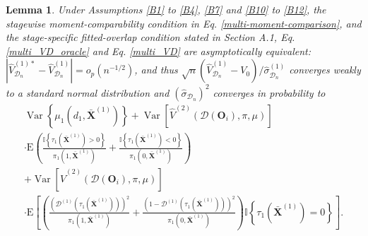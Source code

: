 \documentclass[11pt]{article}
\theoremstyle{referenceplain}
\newtheorem{lemma}{Lemma}[section]
\theoremstyle{referencedefinition}
\theoremstyle{referenceremark}
\begin{document}
\begin{lemma}\label{multi-lem}
      Under Assumptions \ref{B1} to \ref{B4}, \ref{B7} and \ref{B10} to \ref{B12}, the stagewise moment-comparability condition in Eq. \eqref{multi-moment-comparison}, {and the stage-specific fitted-overlap condition stated in Section A.1,} Eq. \eqref{multi_VD_oracle} and Eq. \eqref{multi_VD} are asymptotically equivalent: $|\widehat{V}_{\mathcal{D}_n}^{(1)*} - \widehat{V}_{\mathcal{D}_n}^{(1)}|=o_p(n^{-1/2})$, and thus $\sqrt{n}(\widehat{V}_{\mathcal{D}_n}^{(1)}-V_0)/\widehat{\sigma}_{\mathcal{D}_n}^{(1)}$ converges weakly to a standard normal distribution and $(\widehat{\sigma}_{\mathcal{D}_n})^2$ converges in probability to
    \begin{align*}
          \operatorname{Var}\left\{\mu_1\left(d_1, \bar{\mathbf{X}}^{(1)}\right)\right\}+\operatorname{Var}\left[\widehat{V}^{(2)}(\mathcal{D}(\mathbf{O}_i),\pi,\mu)\right]\\\cdot \mathrm{E}\left(\frac{\mathbb{I}\left\{\tau_1\left(\bar{\mathbf{X}}^{(1)}\right)>0\right\}}{\pi_1\left(1, \bar{\mathbf{X}}^{(1)}\right)}+\frac{\mathbb{I}\left\{\tau_1\left(\bar{\mathbf{X}}^{(1)}\right)<0\right\}}{\pi_1\left(0, \bar{\mathbf{X}}^{(1)}\right)}\right)\\
    +\operatorname{Var}\left[\widehat{V}^{(2)}(\mathcal{D}(\mathbf{O}_i),\pi,\mu)\right]\\\cdot\mathrm{E}\left[\left(\frac{(\mathcal{D}^{(1)}(\tau_1(\bar{\mathbf{X}}^{(1)})))^2}{\pi_1\left(1, \bar{\mathbf{X}}^{(1)}\right)}+\frac{(1-\mathcal{D}^{(1)}(\tau_1(\bar{\mathbf{X}}^{(1)})))^2}{\pi_1\left(0, \bar{\mathbf{X}}^{(1)}\right)}\right) \mathbb{I}\left\{\tau_1\left(\bar{\mathbf{X}}^{(1)}\right)=0\right\}\right].
    \end{align*}
\end{lemma}
\end{document}
